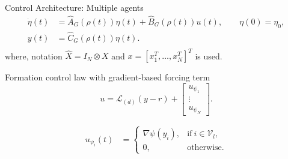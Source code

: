 \documentclass{beamer}
\begin{document}
\begin{frame}{Control Architecture: Multiple agents}
	\begin{equation*} %
		\begin{split}
			\Dot{{\eta}}(t)&=\hat{A}_G(\rho(t)){\eta}(t) + \hat{B}_G(\rho(t)) {u}(t), \quad \quad {\eta}(0)={\eta}_{0},\\
			{y}(t)&=\hat{C}_G(\rho(t)) {\eta}(t). \\
		\end{split}
	\end{equation*}
	where, notation $\hat{X}=I_N \otimes X$ and ${x}=[x_1^T,\hdots,x_N^T]^T$ is used.
	\begin{block}{Formation control law with gradient-based forcing term}
		\begin{equation}\label{eq:control_law}
			{u}=\mathcal{L}_{(d)}({y}-{r})+\begin{bmatrix}u_{\psi_1}\\ \vdots \\u_{\psi_N}\end{bmatrix}.
		\end{equation}
		
		\begin{equation}\label{eq:forcing_term}
			\begin{split}
				u_{\psi_i}(t)&=
				\begin{cases}
					\nabla \psi(y_i), & \text{if}\ i\in \mathcal{V}_l, \\
					0, & \text{otherwise}.
				\end{cases}
			\end{split}
		\end{equation}
	\end{block}
\end{frame}
\end{document}
